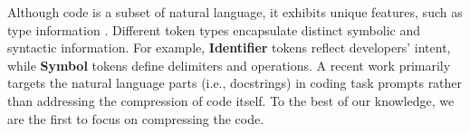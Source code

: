 

Although code is a subset of natural language, it exhibits unique features, such as type information \citep{codelm}. Different token types encapsulate distinct symbolic and syntactic information. For example, \textbf{Identifier} tokens reflect developers’ intent, while \textbf{Symbol} tokens define delimiters and operations. A recent work \citep{less} primarily targets the natural language parts (i.e., docstrings) in coding task prompts rather than addressing the compression of code itself. To the best of our knowledge, we are the first to focus on compressing the code.

